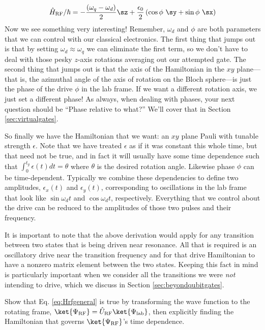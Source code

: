 \begin{equation}
    \label{eq:RFdriveRWA}
    \hat{H}_\mathrm{RF}/\hbar = -\frac{(\omega_q-\omega_d)}{2}\sz + \frac{\epsilon_0}{2} \left(\cos\phi \ \sy + \sin\phi \ \sx\right)
\end{equation}
Now we see something very interesting! Remember, $\omega_d$ and $\phi$ are both parameters that we can control with our classical electronics. The first thing that jumps out is that by setting $\omega_d \approx \omega_q$ we can eliminate the first term, so we don't have to deal with those pesky $z$-axis rotations averaging out our attempted gate. The second thing that jumps out is that the axis of the Hamiltonian in the $xy$ plane---that is, the azimuthal angle of the axis of rotation on the Bloch sphere---is just the phase of the drive $\phi$ in the lab frame. If we want a different rotation axis, we just set a different phase! As always, when dealing with phases, your next question should be ``Phase relative to what?'' We'll cover that in Section \ref{sec:virtualgates}.

So finally we have the Hamiltonian that we want: an $xy$ plane Pauli with tunable strength $\epsilon$. Note that we have treated $\epsilon$ as if it was constant this whole time, but that need not be true, and in fact it will usually have some time dependence such that $\int_0^{t_g} \epsilon(t)dt=\theta$ where $\theta$ is the desired rotation angle. Likewise phase $\phi$ can be time-dependent. Typically we combine these dependencies to define two amplitudes, $\epsilon_x(t)$ and $\epsilon_y(t)$, corresponding to oscillations in the lab frame that look like $\sin\omega_d t$ and $\cos\omega_d t$, respectively. Everything that we control about the drive can be reduced to the amplitudes of those two pulses and their frequency.

It is important to note that the above derivation would apply for any transition between two states that is being driven near resonance. All that is required is an oscillatory drive near the transition frequency and for that drive Hamiltonian to have a nonzero matrix element between the two states. Keeping this fact in mind is particularly important when we consider all the transitions we were \textit{not} intending to drive, which we discuss in Section \ref{sec:beyondqubitgates}.

\begin{exercise}
    Show that Eq. \ref{eq:Hrfgeneral} is true by transforming the wave function to the rotating frame, $\ket{\Psi_\mathrm{RF}} = \hat{U}_\mathrm{RF}\ket{\Psi_\mathrm{lab}}$, then explicitly finding the Hamiltonian that governs $\ket{\Psi_\mathrm{RF}}$'s time dependence.
\end{exercise}

